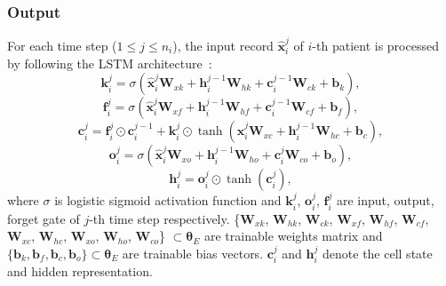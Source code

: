 \subsubsection{Output}
For each time step ($1 \leq j \leq n_i$), the input record $\hat{\mathbf{x}}_i^j$ of $i$-th patient is processed by following the LSTM architecture~\cite{yu2019review}:
\begin{equation}
    \mathbf{k}^j_i = \sigma(\hat{\mathbf{x}}^j_i \mathbf{W}_{xk} + \mathbf{h}_i^{j-1} \mathbf{W}_{hk} + \mathbf{c}_i^{j-1} \mathbf{W}_{ck} + \mathbf{b}_k),
\end{equation}
\begin{equation}
    \mathbf{f}^j_i = \sigma(\hat{\mathbf{x}}^j_i \mathbf{W}_{xf} + \mathbf{h}^{j-1}_i \mathbf{W}_{hf} + \mathbf{c}^{j-1}_i \mathbf{W}_{cf} + \mathbf{b}_f),
\end{equation}
\begin{equation}
    \mathbf{c}^j_i = \mathbf{f}^j_i \odot \mathbf{c}^{j-1}_i + \mathbf{k}^j_i \odot \operatorname{tanh}(\hat{\mathbf{x}}_i^j \mathbf{W}_{xc} + \mathbf{h}^{j - 1}_i \mathbf{W}_{hc} + \mathbf{b}_c),
\end{equation}
\begin{equation}
    \mathbf{o}^j_i = \sigma(\hat{\mathbf{x}}_i^j \mathbf{W}_{xo} + \mathbf{h}^{j-1}_i \mathbf{W}_{ho} + \mathbf{c}^j_i \mathbf{W}_{co} + \mathbf{b}_o),
\end{equation}
\begin{equation}
    \mathbf{h}^j_i = \mathbf{o}^j_i \odot \operatorname{tanh}(\mathbf{c}^j_i),
\end{equation}
where $\sigma$ is logistic sigmoid activation function and $\mathbf{k}^j_i$, $\mathbf{o}^j_i$, $\mathbf{f}^j_i$ are input, output, forget gate of $j$-th time step respectively. \{$\mathbf{W}_{xk}$, $\mathbf{W}_{hk}$, $\mathbf{W}_{ck}$, $\mathbf{W}_{xf}$, $\mathbf{W}_{hf}$, $\mathbf{W}_{cf}$, $\mathbf{W}_{xc}$, $\mathbf{W}_{hc}$, $\mathbf{W}_{xo}$, $\mathbf{W}_{ho}$, $\mathbf{W}_{co}$\} $\subset \mathbf{\theta}_{E}$ are trainable weights matrix and $\{\mathbf{b}_k, \mathbf{b}_f, \mathbf{b}_c, \mathbf{b}_o\} \subset \mathbf{\theta}_{E}$ are trainable bias vectors. $\mathbf{c}_i^j$ and $\mathbf{h}_i^j$ denote the cell state and hidden representation. 

